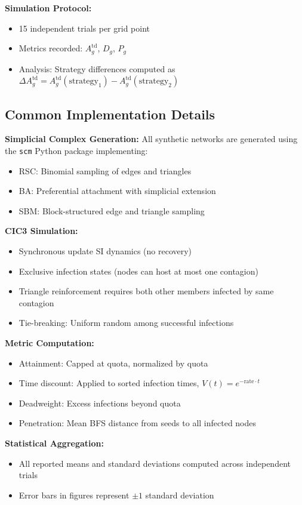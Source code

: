 \documentclass[sigconf]{acmart}
\begin{document}
\textbf{Simulation Protocol:}
\begin{itemize}
    \item 15 independent trials per grid point
    \item Metrics recorded: $A_g^{\text{td}}$, $D_g$, $P_g$
    \item Analysis: Strategy differences computed as $\Delta A_g^{\text{td}} = A_g^{\text{td}}(\text{strategy}_1) - A_g^{\text{td}}(\text{strategy}_2)$
\end{itemize}

\subsection{Common Implementation Details}
\label{app:common}

\textbf{Simplicial Complex Generation:}
All synthetic networks are generated using the \texttt{scm} Python package implementing:
\begin{itemize}
    \item RSC: Binomial sampling of edges and triangles
    \item BA: Preferential attachment with simplicial extension
    \item SBM: Block-structured edge and triangle sampling
\end{itemize}

\textbf{CIC3 Simulation:}
\begin{itemize}
    \item Synchronous update SI dynamics (no recovery)
    \item Exclusive infection states (nodes can host at most one contagion)
    \item Triangle reinforcement requires both other members infected by same contagion
    \item Tie-breaking: Uniform random among successful infections
\end{itemize}

\textbf{Metric Computation:}
\begin{itemize}
    \item Attainment: Capped at quota, normalized by quota
    \item Time discount: Applied to sorted infection times, $V(t) = e^{-\text{rate} \cdot t}$
    \item Deadweight: Excess infections beyond quota
    \item Penetration: Mean BFS distance from seeds to all infected nodes
\end{itemize}

\textbf{Statistical Aggregation:}
\begin{itemize}
    \item All reported means and standard deviations computed across independent trials
    \item Error bars in figures represent $\pm 1$ standard deviation
\end{itemize}
\end{document}
